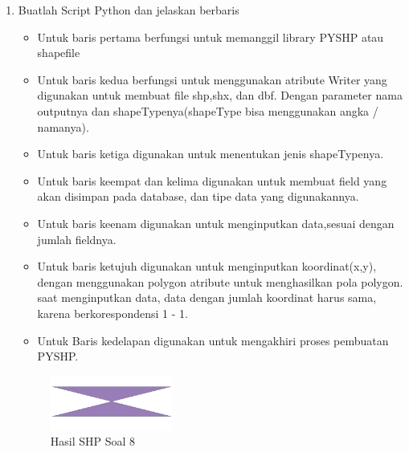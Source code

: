 \begin{enumerate}
	\item Buatlah Script Python dan jelaskan berbaris
	
	\begin{itemize}
		\item Untuk baris pertama berfungsi untuk memanggil library PYSHP atau shapefile
		\item Untuk baris kedua berfungsi untuk menggunakan atribute Writer yang digunakan untuk membuat file shp,shx, dan dbf. \hfill\break Dengan parameter nama outputnya dan shapeTypenya(shapeType bisa menggunakan angka / namanya).
		\item Untuk baris ketiga digunakan untuk menentukan jenis shapeTypenya.
		\item Untuk baris keempat dan kelima digunakan untuk membuat field yang akan disimpan pada database, dan tipe data yang digunakannya.
		\item Untuk baris keenam digunakan untuk menginputkan data,sesuai dengan jumlah fieldnya.
		\item Untuk baris ketujuh digunakan untuk menginputkan koordinat(x,y), dengan menggunakan polygon atribute untuk menghasilkan pola polygon. \hfill\break
		saat menginputkan data, data dengan jumlah koordinat harus sama, karena berkorespondensi 1 - 1.
		\item Untuk Baris kedelapan digunakan untuk mengakhiri proses pembuatan PYSHP.
	\end{itemize}
	\hfill\break
	\begin{figure}[H]
		\includegraphics[width=4cm]{figures/1174002/2/8.png}
		\centering
		\caption{Hasil SHP Soal 8}
	\end{figure}


\end{enumerate}
